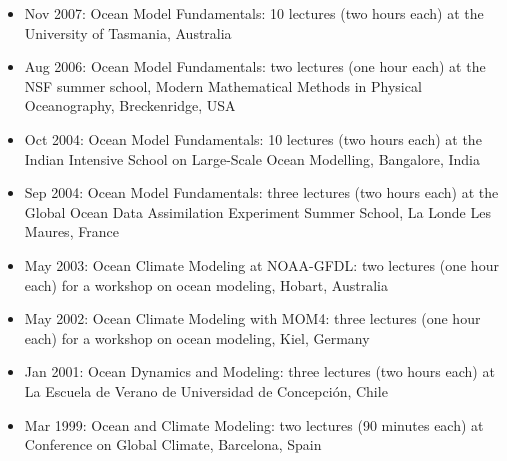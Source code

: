 \begin{itemize}[leftmargin=*]
\item Nov 2007: {\sc Ocean Model Fundamentals}: 10 lectures (two hours each) at the University of Tasmania, Australia 

\item Aug 2006: {\sc Ocean Model Fundamentals}: two lectures (one hour each) at the NSF summer school, {\sc Modern Mathematical Methods in
Physical Oceanography}, Breckenridge, USA

\item Oct 2004: {\sc Ocean Model Fundamentals}: 10 lectures (two hours each) at the {\sc Indian Intensive School on Large-Scale Ocean Modelling}, Bangalore, India

\item Sep 2004: {\sc Ocean Model Fundamentals}: three lectures (two hours each) at the {\sc Global Ocean Data Assimilation Experiment  Summer School}, La Londe Les Maures, France

\item May 2003: {\sc Ocean Climate Modeling at NOAA-GFDL}: two lectures (one hour each) for a workshop on ocean modeling, Hobart, Australia

\item May 2002: {\sc Ocean Climate Modeling with MOM4}: three lectures (one hour each) for a workshop on ocean modeling, Kiel, Germany

\item Jan 2001: {\sc Ocean Dynamics and Modeling}: three lectures (two hours each) at La Escuela de Verano de Universidad de Concepci\'on, Chile

\item Mar 1999: {\sc Ocean and Climate Modeling}: two lectures (90 minutes each) at {\sc Conference on Global Climate}, Barcelona,
Spain

\end{itemize}








